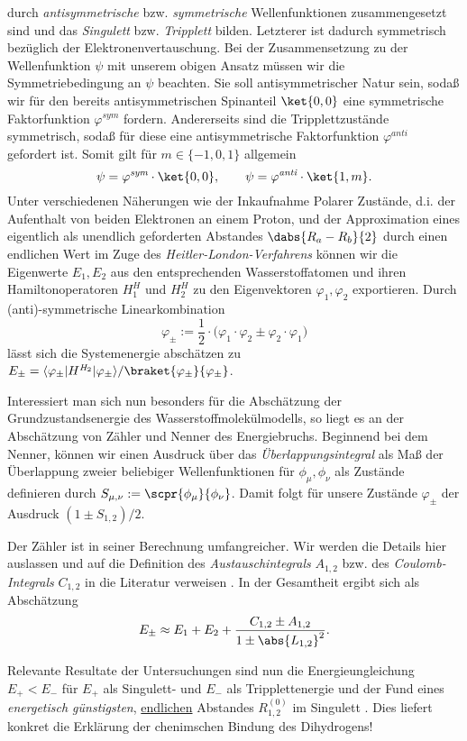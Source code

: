 \documentclass[../main.tex]{subfiles}
\begin{document}
            durch \emph{antisymmetrische} bzw. \emph{symmetrische} Wellenfunktionen zusammengesetzt sind und das \emph{Singulett} bzw. \emph{Tripplett} bilden. Letzterer ist dadurch symmetrisch bezüglich der Elektronenvertauschung. Bei der Zusammensetzung zu der Wellenfunktion $\psi$ mit unserem obigen Ansatz müssen wir die Symmetriebedingung an $\psi$ beachten. Sie soll antisymmetrischer Natur sein, sodaß wir für den bereits antisymmetrischen Spinanteil $\ket{0,0}$ eine symmetrische Faktorfunktion $\varphi^\textit{sym}$ fordern. Andererseits sind die Tripplettzustände symmetrisch, sodaß für diese eine antisymmetrische Faktorfunktion $\varphi^\textit{anti}$ gefordert ist. Somit gilt für $m\in\{-1,0,1\}$ allgemein
            \[
                \psi = \varphi^\textit{sym}\cdot\ket{0,0},\qquad \psi = \varphi^\textit{anti}\cdot\ket{1,m}.
            \]
            Unter verschiedenen Näherungen wie der Inkaufnahme Polarer Zustände, d.i. der Aufenthalt von beiden Elektronen an einem Proton, und der Approximation eines eigentlich als unendlich geforderten Abstandes $\dabs{R_a - R_b}{2}$ durch einen endlichen Wert im Zuge des \emph{Heitler-London-Verfahrens} können wir die Eigenwerte $E_1,E_2$ aus den entsprechenden Wasserstoffatomen und ihren Hamiltonoperatoren $H_1^\textit{H}$ und $H_2^\textit{H}$ zu den Eigenvektoren $\varphi_1,\varphi_2$ exportieren. Durch (anti)-symmetrische Linearkombination
            \[
                \varphi_\pm := \frac{1}{2}\cdot\Big(\varphi_1\cdot\varphi_2\pm\varphi_2\cdot\varphi_1\Big)
            \]
            lässt sich die Systemenergie abschätzen zu $E_\pm = \langle\varphi_\pm|H^{\textit{H}_2}|\varphi_\pm\rangle/\braket{\varphi_\pm}{\varphi_\pm}$. 

            \begin{shaded}
                Interessiert man sich nun besonders für die Abschätzung der Grundzustandsenergie des Wasserstoffmolekülmodells, so liegt es an der Abschätzung von Zähler und Nenner des Energiebruchs. Beginnend bei dem Nenner, können wir einen Ausdruck über das \emph{Überlappungsintegral} als Maß der Überlappung zweier beliebiger Wellenfunktionen für $\phi_\mu,\phi_\nu$ als Zustände definieren durch $S_{\mu,\nu}:=\scpr{\phi_\mu}{\phi_\nu}$. Damit folgt für unsere Zustände $\varphi_\pm$ der Ausdruck $(1\pm S_{1,2})/2$. 

                Der Zähler ist in seiner Berechnung umfangreicher. Wir werden die Details hier auslassen und auf die Definition des \emph{Austauschintegrals} $A_{1,2}$ bzw. des \emph{Coulomb-Integrals} $C_{1,2}$ in die Literatur verweisen \cite[p.301]{nolting51}. In der Gesamtheit ergibt sich als Abschätzung
                \[
                    E_\pm\approx E_1 + E_2 + \frac{C_{1,2}\pm A_{1,2}}{1\pm \abs{L_{1,2}}^2}.
                \]
            \end{shaded}
            Relevante Resultate der Untersuchungen sind nun die Energieungleichung $E_+ < E_-$ für $E_+$ als Singulett- und $E_-$ als Tripplettenergie und der Fund eines \emph{energetisch günstigsten}, \underline{endlichen} Abstandes $R_{1,2}^{(0)}$ im Singulett \cite[p.297-302]{nolting51}. Dies liefert konkret die Erklärung der chenimschen Bindung des Dihydrogens! 
    
\end{document}
